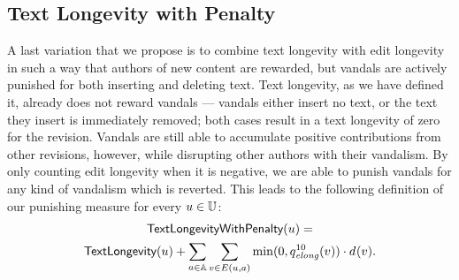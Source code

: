 \subsection{Text Longevity with Penalty}

\noindent
A last variation that we propose is to combine text longevity with
edit longevity in such a way that authors of new content are rewarded,
but vandals are actively punished for both inserting and deleting text.
Text longevity, as we have defined it, already does not
reward vandals --- vandals either insert no text, or the
text they insert is immediately removed; both cases result
in a text longevity of zero for the revision.
Vandals are still able to accumulate positive contributions
from other revisions, however, while disrupting other
authors with their vandalism.
By only counting edit longevity when it is negative,
we are able to punish vandals for any kind of vandalism
which is reverted.
This leads to the following definition of our punishing
measure for every $u \in \mathbb{U}$:
%
\begin{gather*}
\punish(u) = \\
\textlong(u) +
\sum_{a \in \articles} \sum_{v \in E(u, a)} \min(0, \quality{elong}{10}{v}) \cdot \dist{}{v}.
\end{gather*}
%

